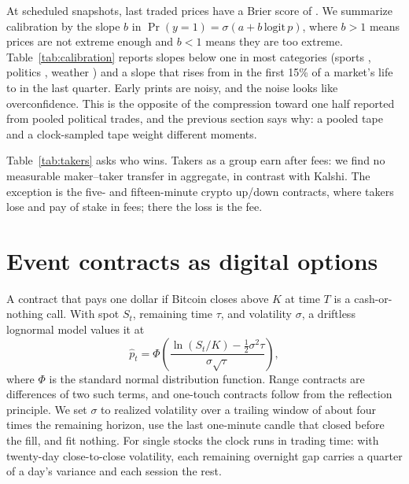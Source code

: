 \documentclass[format=acmsmall, review=false]{acmart}
\begin{document}
At scheduled snapshots, last traded prices have a Brier score of \brierOverall{}. We summarize calibration by the slope $b$ in $\Pr(y=1)=\sigma(a+b\,\mathrm{logit}\,p)$, where $b>1$ means prices are not extreme enough and $b<1$ means they are too extreme. Table~\ref{tab:calibration} reports slopes below one in most categories (sports \slopeSports{}, politics \slopePolitics{}, weather \slopeWeather{}) and a slope that rises from \slopeEarly{} in the first 15\% of a market's life to \slopeLate{} in the last quarter. Early prints are noisy, and the noise looks like overconfidence. This is the opposite of the compression toward one half reported from pooled political trades, and the previous section says why: a pooled tape and a clock-sampled tape weight different moments.



Table~\ref{tab:takers} asks who wins. Takers as a group earn \takerNet{} after fees: we find no measurable maker--taker transfer in aggregate, in contrast with Kalshi. The exception is the five- and fifteen-minute crypto up/down contracts, where takers lose \updownTakerLoss{} and pay \updownFee{} of stake in fees; there the loss is the fee.



\section{Event contracts as digital options}\label{sec:options}

A contract that pays one dollar if Bitcoin closes above $K$ at time $T$ is a cash-or-nothing call. With spot $S_t$, remaining time $\tau$, and volatility $\sigma$, a driftless lognormal model values it at
\begin{equation}\label{eq:digital}
\hat p_t=\Phi\!\left(\frac{\ln(S_t/K)-\tfrac12\sigma^2\tau}{\sigma\sqrt{\tau}}\right),
\end{equation}
where $\Phi$ is the standard normal distribution function. Range contracts are differences of two such terms, and one-touch contracts follow from the reflection principle. We set $\sigma$ to realized volatility over a trailing window of about four times the remaining horizon, use the last one-minute candle that closed before the fill, and fit nothing. For single stocks the clock runs in trading time: with twenty-day close-to-close volatility, each remaining overnight gap carries a quarter of a day's variance and each session the rest.
\end{document}
